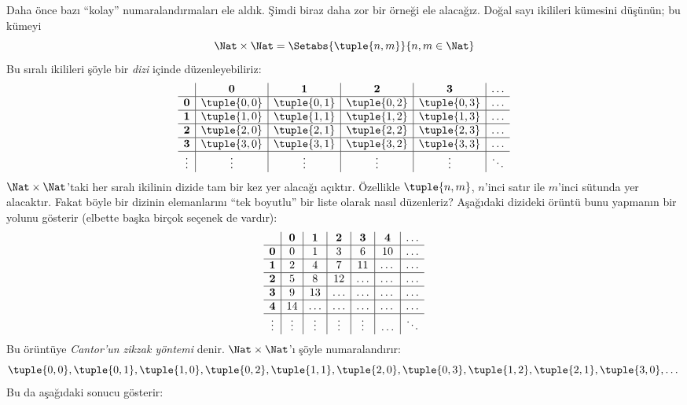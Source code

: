 \documentclass[../../../include/open-logic-section]{subfiles}
\begin{document}


\begin{explain}
Daha önce bazı ``kolay'' numaralandırmaları ele aldık. Şimdi biraz daha zor
bir örneği ele alacağız. Doğal sayı ikilileri kümesini düşünün; bu kümeyi
\[
\Nat \times \Nat = \Setabs{\tuple{n,m}}{n,m \in \Nat}
\]
Bu sıralı ikilileri şöyle bir \emph{dizi} içinde düzenleyebiliriz:
\[
\begin{array}{ c | c | c | c | c | c}
& \mathbf 0 & \mathbf 1 & \mathbf 2 & \mathbf 3 & \dots \\
\hline
\mathbf 0 & \tuple{0,0} & \tuple{0,1} & \tuple{0,2} & \tuple{0,3} & \dots \\
\hline
\mathbf 1 & \tuple{1,0} & \tuple{1,1} & \tuple{1,2} & \tuple{1,3} & \dots \\
\hline
\mathbf 2 & \tuple{2,0} & \tuple{2,1} & \tuple{2,2} & \tuple{2,3} & \dots \\
\hline
\mathbf 3 & \tuple{3,0} & \tuple{3,1} & \tuple{3,2} & \tuple{3,3} & \dots \\
\hline
\vdots & \vdots & \vdots & \vdots & \vdots & \ddots\\
\end{array}
\]
$\Nat \times \Nat$'taki her sıralı ikilinin dizide tam bir kez yer alacağı
açıktır. Özellikle $\tuple{n,m}$, $n$'inci satır ile $m$'inci sütunda yer
alacaktır. Fakat böyle bir dizinin elemanlarını ``tek boyutlu'' bir liste
olarak nasıl düzenleriz? Aşağıdaki dizideki örüntü bunu yapmanın bir yolunu
gösterir (elbette başka birçok seçenek de vardır):
\[
\begin{array}{ c | c | c | c | c | c | c}
& \mathbf 0 & \mathbf 1 & \mathbf 2 & \mathbf 3 & \mathbf 4 &\dots \\
\hline
\mathbf 0 & 0  & 1& 3 & 6& 10 &\ldots \\
\hline
\mathbf 1 &2 & 4& 7 & 11 & \dots &\ldots \\
\hline
\mathbf 2 & 5 & 8 & 12 & \ldots & \dots&\ldots \\
\hline
\mathbf 3 & 9 & 13 & \ldots & \ldots & \dots & \ldots \\
\hline
\mathbf 4 & 14 & \ldots & \ldots & \ldots & \dots & \ldots \\
\hline
\vdots & \vdots & \vdots & \vdots & \vdots&\ldots & \ddots\\
\end{array}
\]\noindent
Bu örüntüye \emph{Cantor'un zikzak yöntemi} denir. $\Nat \times \Nat$'ı
şöyle numaralandırır:
\[
\tuple{0,0}, \tuple{0,1}, \tuple{1,0}, \tuple{0,2}, \tuple{1,1},
\tuple{2,0}, \tuple{0,3}, \tuple{1,2}, \tuple{2,1}, \tuple{3,0}, \dots
\]
Bu da aşağıdaki sonucu gösterir:
\end{explain}
\end{document}
